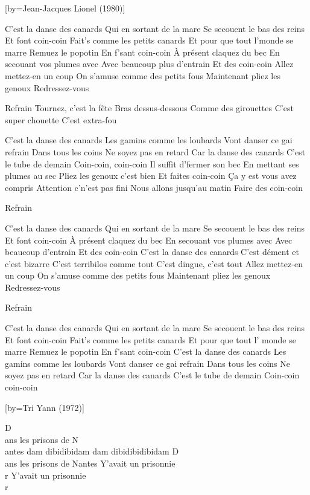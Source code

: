 [by={Jean-Jacques Lionel (1980)}]

\beginverse
C'est la danse des canards
Qui en sortant de la mare
Se secouent le bas des reins
Et font coin-coin
Fait's comme les petits canards
Et pour que tout l'monde se marre
Remuez le popotin
En f'sant coin-coin
À présent claquez du bec
En secouant vos plumes avec
Avec beaucoup plus d'entrain
Et des coin-coin
Allez mettez-en un coup
On s'amuse comme des petits fous
Maintenant pliez les genoux
Redressez-vous
\endverse

\beginverse
Refrain
Tournez, c'est la fête
Bras dessus-dessous
Comme des girouettes
C'est super chouette
C'est extra-fou
\endverse

\beginverse
C'est la danse des canards
Les gamins comme les loubards
Vont danser ce gai refrain
Dans tous les coins
Ne soyez pas en retard
Car la danse des canards
C'est le tube de demain
Coin-coin, coin-coin
Il suffit d'fermer son bec
En mettant ses plumes au sec
Pliez les genoux c'est bien
Et faites coin-coin
Ça y est vous avez compris
Attention c'n'est pas fini
Nous allons jusqu'au matin
Faire des coin-coin
\endverse

\beginverse
Refrain
\endverse

\beginverse
C'est la danse des canards
Qui en sortant de la mare
Se secouent le bas des reins
Et font coin-coin
À présent claquez du bec
En secouant vos plumes avec
Avec beaucoup d'entrain
Et des coin-coin
C'est la danse des canards
C'est dément et c'est bizarre
C'est terribilos comme tout
C'est dingue, c'est tout
Allez mettez-en un coup
On s'amuse comme des petits fous
Maintenant pliez les genoux
Redressez-vous
\endverse

\beginverse
Refrain
\endverse

\beginverse
C'est la danse des canards
Qui en sortant de la mare
Se secouent le bas des reins
Et font coin-coin
Fait's comme les petits canards
Et pour que tout l' monde se marre
Remuez le popotin
En f'sant coin-coin
C'est la danse des canards
Les gamins comme les loubards
Vont danser ce gai refrain
Dans tous les coins
Ne soyez pas en retard
Car la danse des canards
C'est le tube de demain
Coin-coin coin-coin
\endverse

[by={Tri Yann (1972)}]

\beginverse
D\\[lam]ans les prisons de N\\[Sol]antes
dam dibidibidam dam dibidibidibidam
D\\[Lam]ans les prisons de Nantes
Y'avait un prisonnie\\[Sol]r
Y'avait un prisonnie\\[Lam]r\\[Mim]\\[Lam] 
\endverse

